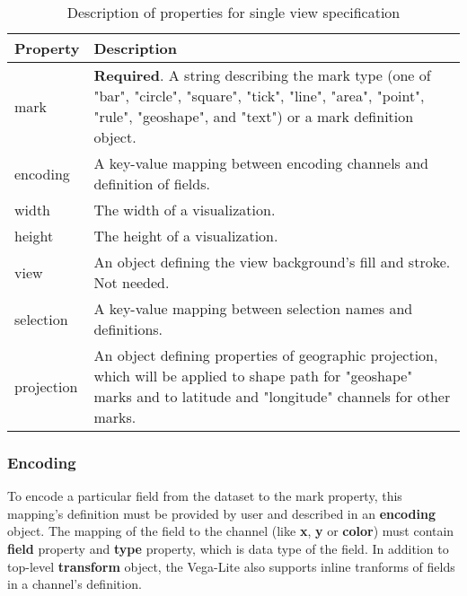   \begin{table}[htbp]
        \centering
        \caption{Description of properties for single view specification\cite{vega-lite-single-view-specification}}
        \label{table:single-view-specifications}
            \begin{tabular}{ m{8em} m{22em} }
            \toprule
                \textbf{Property} & \textbf{Description} \\
            \toprule

       mark                         & \textbf{Required}. A string describing the mark type (one of "bar", "circle", "square", "tick", "line", "area", "point", "rule", "geoshape", and "text") or a mark definition object. \\
\hline encoding    & A key-value mapping between encoding channels and definition of fields. \\
\hline width               & The width of a visualization. \\
\hline height           & The height of a visualization. \\
\hline view             & An object defining the view background’s fill and stroke. Not needed. \\
\hline selection     & A key-value mapping between selection names and definitions. \\
\hline projection    & An object defining properties of geographic projection, which will be applied to shape path for "geoshape" marks and to latitude and "longitude" channels for other marks. \\
\hline
            \end{tabular}
        \end{table}

\clearpage

\subsubsection{Encoding}
To encode a particular field from the dataset to the mark property, this mapping's definition must be provided by user and described in an \textbf{encoding} object.
The mapping of the field to the channel (like \textbf{x}, \textbf{y} or \textbf{color}) must contain \textbf{field} property and \textbf{type} property, which is data type of the field. In addition to top-level \textbf{transform} object, the Vega-Lite also supports inline tranforms of fields in a channel's definition.

